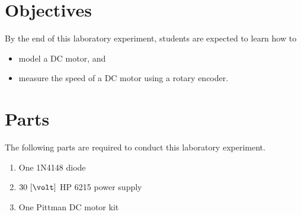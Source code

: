 
\section{Objectives}
By the end of this laboratory experiment, students are expected to learn how to 

\begin{itemize}

\item model a DC motor, and 
  
\item measure the  speed of a DC motor using a rotary encoder. 
   
\end{itemize}

\section{Parts}
\label{sec:partsDC-MotorModeling}
The following parts are required to conduct this laboratory experiment. %
%
\begin{enumerate}
\item One 1N4148 diode 
\item $30~[\volt]$ HP 6215 power supply
\item One Pittman DC motor kit
\end{enumerate}

